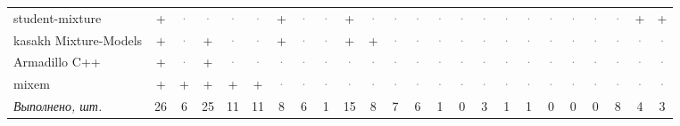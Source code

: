 \documentclass[10pt,a4paper]{article}
\begin{document}
\begin{landscape}
{\begin{longtable}{@{}l *{23}{c}@{}}
student-mixture & \cellcolor{yes!35}+ & \textcolor{gray}{·} & \textcolor{gray}{·} & \textcolor{gray}{·} & \textcolor{gray}{·} & \cellcolor{yes!35}+ & \textcolor{gray}{·} & \textcolor{gray}{·} & \cellcolor{yes!35}+ & \textcolor{gray}{·} & \textcolor{gray}{·} & \textcolor{gray}{·} & \textcolor{gray}{·} & \textcolor{gray}{·} & \textcolor{gray}{·} & \textcolor{gray}{·} & \textcolor{gray}{·} & \textcolor{gray}{·} & \textcolor{gray}{·} & \textcolor{gray}{·} & \textcolor{gray}{·} & \cellcolor{yes!35}+ & \cellcolor{yes!35}+ \\
kasakh Mixture-Models & \cellcolor{yes!35}+ & \textcolor{gray}{·} & \cellcolor{yes!35}+ & \textcolor{gray}{·} & \textcolor{gray}{·} & \cellcolor{yes!35}+ & \textcolor{gray}{·} & \textcolor{gray}{·} & \cellcolor{yes!35}+ & \cellcolor{yes!35}+ & \textcolor{gray}{·} & \textcolor{gray}{·} & \textcolor{gray}{·} & \textcolor{gray}{·} & \textcolor{gray}{·} & \textcolor{gray}{·} & \textcolor{gray}{·} & \textcolor{gray}{·} & \textcolor{gray}{·} & \textcolor{gray}{·} & \textcolor{gray}{·} & \textcolor{gray}{·} & \textcolor{gray}{·} \\
Armadillo C++ & \cellcolor{yes!35}+ & \textcolor{gray}{·} & \cellcolor{yes!35}+ & \textcolor{gray}{·} & \textcolor{gray}{·} & \textcolor{gray}{·} & \textcolor{gray}{·} & \textcolor{gray}{·} & \textcolor{gray}{·} & \textcolor{gray}{·} & \textcolor{gray}{·} & \textcolor{gray}{·} & \textcolor{gray}{·} & \textcolor{gray}{·} & \textcolor{gray}{·} & \textcolor{gray}{·} & \textcolor{gray}{·} & \textcolor{gray}{·} & \textcolor{gray}{·} & \textcolor{gray}{·} & \textcolor{gray}{·} & \textcolor{gray}{·} & \textcolor{gray}{·} \\
mixem & \cellcolor{yes!35}+ & \cellcolor{yes!35}+ & \cellcolor{yes!35}+ & \cellcolor{yes!35}+ & \cellcolor{yes!35}+ & \textcolor{gray}{·} & \textcolor{gray}{·} & \textcolor{gray}{·} & \textcolor{gray}{·} & \textcolor{gray}{·} & \textcolor{gray}{·} & \textcolor{gray}{·} & \textcolor{gray}{·} & \textcolor{gray}{·} & \textcolor{gray}{·} & \textcolor{gray}{·} & \textcolor{gray}{·} & \textcolor{gray}{·} & \textcolor{gray}{·} & \textcolor{gray}{·} & \textcolor{gray}{·} & \textcolor{gray}{·} & \textcolor{gray}{·} \\
\midrule \textit{Выполнено, шт.} & 26 & 6 & 25 & 11 & 11 & 8 & 6 & 1 & 15 & 8 & 7 & 6 & 1 & 0 & 3 & 1 & 1 & 0 & 0 & 0 & 8 & 4 & 3 \\
\bottomrule
\end{longtable}}
{\scriptsize\setlength{\tabcolsep}{3pt}
\begin{tabular}{@{}l >{\raggedright\arraybackslash}p{7.4cm} l l >{\raggedright\arraybackslash}p{7.4cm} l@{}}

\end{tabular}}
\end{landscape}
\end{document}
